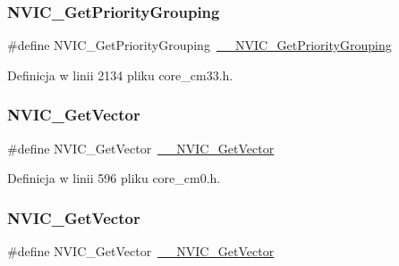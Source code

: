 \subsubsection{\texorpdfstring{N\+V\+I\+C\+\_\+\+Get\+Priority\+Grouping}{NVIC\_GetPriorityGrouping}\hspace{0.1cm}{\footnotesize\ttfamily [10/10]}}
{\footnotesize\ttfamily \#define N\+V\+I\+C\+\_\+\+Get\+Priority\+Grouping~\hyperlink{group___c_m_s_i_s___core___n_v_i_c_functions_ga9b894af672df4373eb637f8288845c05}{\+\_\+\+\_\+\+N\+V\+I\+C\+\_\+\+Get\+Priority\+Grouping}}



Definicja w linii 2134 pliku core\+\_\+cm33.\+h.

\mbox{\label{group___c_m_s_i_s___core___n_v_i_c_functions_ga955eb1c33a3dcc62af11a8385e8c0fc8}} 
\subsubsection{\texorpdfstring{N\+V\+I\+C\+\_\+\+Get\+Vector}{NVIC\_GetVector}\hspace{0.1cm}{\footnotesize\ttfamily [1/12]}}
{\footnotesize\ttfamily \#define N\+V\+I\+C\+\_\+\+Get\+Vector~\hyperlink{group___c_m_s_i_s___core___n_v_i_c_functions_ga44b665d2afb708121d9b10c76ff00ee5}{\+\_\+\+\_\+\+N\+V\+I\+C\+\_\+\+Get\+Vector}}



Definicja w linii 596 pliku core\+\_\+cm0.\+h.

\mbox{\label{group___c_m_s_i_s___core___n_v_i_c_functions_ga955eb1c33a3dcc62af11a8385e8c0fc8}} 
\subsubsection{\texorpdfstring{N\+V\+I\+C\+\_\+\+Get\+Vector}{NVIC\_GetVector}\hspace{0.1cm}{\footnotesize\ttfamily [2/12]}}
{\footnotesize\ttfamily \#define N\+V\+I\+C\+\_\+\+Get\+Vector~\hyperlink{group___c_m_s_i_s___core___n_v_i_c_functions_ga44b665d2afb708121d9b10c76ff00ee5}{\+\_\+\+\_\+\+N\+V\+I\+C\+\_\+\+Get\+Vector}}



